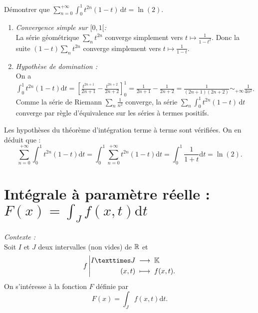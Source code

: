 \documentclass{book}
\begin{document}
\begin{Exemple} Démontrer que $\sum_{n=0}^{+\infty}\int_0^1 t^{2n}(1-t)\,\mathrm dt=\ln(2)$.
\begin{enumerate}
\item \textit{Convergence simple sur $[0,1[$:}\\ 
La série géométrique $\sum_n t^{2n}$ converge simplement vers $t\mapsto \frac{1}{1-t^2}.$ Donc la  suite $(1-t)\sum_n t^{2n}$ converge simplement vers $t\mapsto \frac{1}{1-t}.$
\item \textit{Hypothèse de domination :}\\ 
On a $\int_0^1 t^{2n}(1-t) \mathrm dt = [\frac{t^{2n+1}}{2n+1}-\frac{t^{2n+2}}{2n+2}]_0^1=\frac{1}{2n+1}-\frac{1}{2n+2}=\frac{1}{(2n+1)(2n+2)}\sim_{+\infty}\frac{1}{4n^2}$. Comme  la série de Riemann $\sum_n \frac{1}{n^2}$ converge, la série $\sum_n \int_0^1 t^{2n}(1-t) \,\mathrm dt$ converge par règle d'équivalence sur les séries à termes positifs.
\end{enumerate}
Les hypothèses du théorème d'intégration terme à terme sont vérifiées. On en déduit que :
$$\sum_{n=0}^{+\infty}\int_0^1 t^{2n}(1-t)\mathrm dt=\int_0^1 \sum_{n=0}^{+\infty} t^{2n}(1-t)\mathrm dt=\int_0^1 \frac{1}{1+t}\mathrm dt=\ln(2).$$
\end{Exemple}
\section{Intégrale à paramètre réelle : $F(x) = \int_J f(x,t) \mathrm dt$ }
\textit{Contexte :}\\
 Soit $I$ et $J$ deux intervalles (non vides) de $\mathbb{R}$ et
\[ \Fonction{f}{I×J}\K{(x,t)}{f(x,t).} \]
On s'intéresse à la fonction $F$ définie par
\[ F(x) = \int_J f(x,t) \mathrm dt. \]
\end{document}
